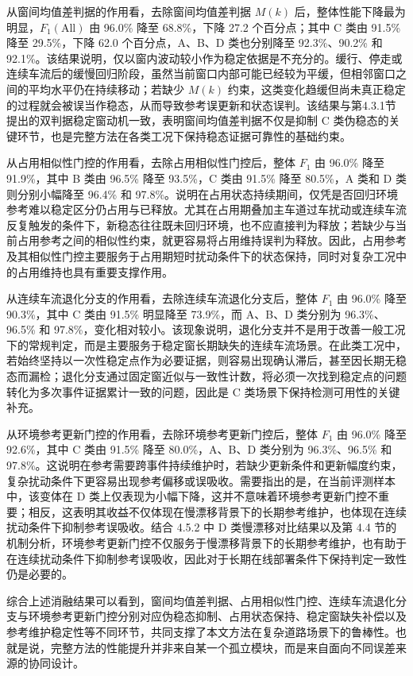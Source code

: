 \documentclass{xdupgthesis}
\begin{document}
从窗间均值差判据的作用看，去除窗间均值差判据 $M(k)$ 后，整体性能下降最为明显，$F_1(\mathrm{All})$ 由 96.0\% 降至 68.8\%，下降 27.2 个百分点；其中 C 类由 91.5\% 降至 29.5\%，下降 62.0 个百分点，A、B、D 类也分别降至 92.3\%、90.2\% 和 92.1\%。该结果说明，仅以窗内波动较小作为稳定依据是不充分的。缓行、停走或连续车流后的缓慢回归阶段，虽然当前窗口内部可能已经较为平缓，但相邻窗口之间的平均水平仍在持续移动；若缺少 $M(k)$ 约束，这类变化趋缓但尚未真正稳定的过程就会被误当作稳态，从而导致参考误更新和状态误判。该结果与第4.3.1节提出的双判据稳定窗动机一致，表明窗间均值差判据不仅是抑制 C 类伪稳态的关键环节，也是完整方法在各类工况下保持稳态证据可靠性的基础约束。

从占用相似性门控的作用看，去除占用相似性门控后，整体 $F_1$ 由 96.0\% 降至 91.9\%，其中 B 类由 96.5\% 降至 93.5\%，C 类由 91.5\% 降至 80.5\%，A 类和 D 类则分别小幅降至 96.4\% 和 97.8\%。说明在占用状态持续期间，仅凭是否回归环境参考难以稳定区分仍占用与已释放。尤其在占用期叠加主车道过车扰动或连续车流反复触发的条件下，新稳态往往既未回归环境，也不应直接判为释放；若缺少与当前占用参考之间的相似性约束，就更容易将占用维持误判为释放。因此，占用参考及其相似性门控主要服务于占用期短时扰动条件下的状态保持，同时对复杂工况中的占用维持也具有重要支撑作用。

从连续车流退化分支的作用看，去除连续车流退化分支后，整体 $F_1$ 由 96.0\% 降至 90.3\%，其中 C 类由 91.5\% 明显降至 73.9\%，而 A、B、D 类分别为 96.3\%、96.5\% 和 97.8\%，变化相对较小。该现象说明，退化分支并不是用于改善一般工况下的常规判定，而是主要服务于稳定窗长期缺失的连续车流场景。在此类工况中，若始终坚持以一次性稳定点作为必要证据，则容易出现确认滞后，甚至因长期无稳态而漏检；退化分支通过固定窗近似与一致性计数，将必须一次找到稳定点的问题转化为多次事件证据累计一致的问题，因此是 C 类场景下保持检测可用性的关键补充。

从环境参考更新门控的作用看，去除环境参考更新门控后，整体 $F_1$ 由 96.0\% 降至 92.6\%，其中 C 类由 91.5\% 降至 80.0\%，A、B、D 类分别为 96.3\%、96.5\% 和 97.8\%。这说明在参考需要跨事件持续维护时，若缺少更新条件和更新幅度约束，复杂扰动条件下更容易出现参考偏移或误吸收。需要指出的是，在当前评测样本中，该变体在 D 类上仅表现为小幅下降，这并不意味着环境参考更新门控不重要；相反，这表明其收益不仅体现在慢漂移背景下的长期参考维护，也体现在连续扰动条件下抑制参考误吸收。结合 4.5.2 中 D 类慢漂移对比结果以及第 4.4 节的机制分析，环境参考更新门控不仅服务于慢漂移背景下的长期参考维护，也有助于在连续扰动条件下抑制参考误吸收，因此对于长期在线部署条件下保持判定一致性仍是必要的。

综合上述消融结果可以看到，窗间均值差判据、占用相似性门控、连续车流退化分支与环境参考更新门控分别对应伪稳态抑制、占用状态保持、稳定窗缺失补偿以及参考维护稳定性等不同环节，共同支撑了本文方法在复杂道路场景下的鲁棒性。也就是说，完整方法的性能提升并非来自某一个孤立模块，而是来自面向不同误差来源的协同设计。
\end{document}
